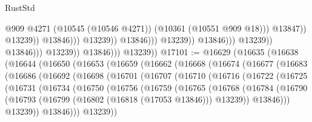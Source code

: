 \begin{lexlean}{RustStd}
\begin{coremodule}
                                                                @909
                                                                @4271
                                                                (@10545 (@10546 @4271))
                                                                (@10361 (@10551 @909 @18)))
                                                              @13847))
                                                          @13239))
                                                      @13846)))
                                                @13239))
                                            @13846)))
                                      @13239))
                                  @13846)))
                            @13239))
                        @13846)))
                  @13239))
              @13846)))
        @13239))
@17101 := @16629
    (@16635
      (@16638
        (@16644
          (@16650
            (@16653
              (@16659
                (@16662
                  (@16668
                    (@16674
                      (@16677
                        (@16683
                          (@16686
                            (@16692
                              (@16698
                                (@16701
                                  (@16707
                                    (@16710
                                      (@16716
                                        (@16722
                                          (@16725
                                            (@16731
                                              (@16734
                                                (@16750
                                                  (@16756
                                                    (@16759
                                                      (@16765
                                                        (@16768
                                                          (@16784
                                                            (@16790
                                                              (@16793
                                                                (@16799
                                                                  (@16802 (@16818 (@17053 @13846)))
                                                                  @13239))
                                                              @13846)))
                                                        @13239))
                                                    @13846)))
                                              @13239))

\end{coremodule}
\end{lexlean}

